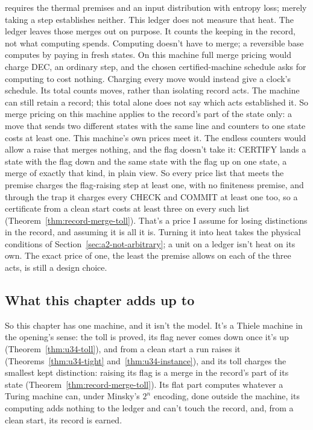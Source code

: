 \documentclass[11pt,twoside]{article}
\theoremstyle{thielethm}
\theoremstyle{thieledef}
\theoremstyle{thieledef}
\theoremstyle{thieledef}
\theoremstyle{thielethm}
\theoremstyle{thieleobs}
\theoremstyle{thielethm}
\begin{document}
\begin{itemize}
requires the thermal premises and an input distribution with entropy loss;
merely taking a step establishes neither. This ledger does not measure that heat. The
ledger leaves those merges out on purpose. It counts the keeping in the record, not what computing
spends. Computing doesn't have to merge; a reversible base computes by paying in fresh states. On this machine
full merge pricing would charge DEC, an ordinary step, and the chosen certified-machine schedule asks for computing to cost
nothing. Charging every move would instead give a clock's schedule. Its total counts moves, rather than isolating
record acts. The machine can still retain a record; this total alone does not
say which acts established it. So
merge pricing on this machine applies to the record's part of the state only: a move that sends two different
states with the same line and counters to one state costs at least one. This machine's own prices
meet it. The endless counters would allow a raise that merges nothing, and the flag
doesn't take it: CERTIFY lands a state with the flag down and the same state with the flag up on
one state, a merge of exactly that kind, in plain view. So every price list that meets the premise charges the flag-raising step at least one, with no finiteness premise, and through the trap it charges every CHECK and COMMIT at least one too, so a certificate from a clean start costs at least three on every such list (Theorem~\ref{thm:record-merge-toll}). That's a price I assume for losing distinctions in the
record, and assuming it is all it is. Turning it into heat takes the physical conditions of
Section~\ref{sec:a2-not-arbitrary}; a unit on a ledger isn't heat on its own. The exact price of one, the least the premise allows on each of the three acts, is still a design choice.
\end{itemize}

\subsection{What this chapter adds up to}

So this chapter has one machine, and it isn't the model. It's a Thiele machine in the opening's sense:
the toll is proved, its flag never comes down once it's up (Theorem~\ref{thm:u34-toll}), and from a
clean start a run raises it (Theorems~\ref{thm:u34-tight} and~\ref{thm:u34-instance}), and
its toll charges the smallest kept distinction: raising its flag is a merge in the record's part of its state
(Theorem~\ref{thm:record-merge-toll}). Its flat part computes whatever a Turing machine can, under Minsky's
$2^n$ encoding, done outside the machine, its computing adds nothing to the ledger and can't touch
the record, and, from a clean start, its record is earned.
\end{document}
